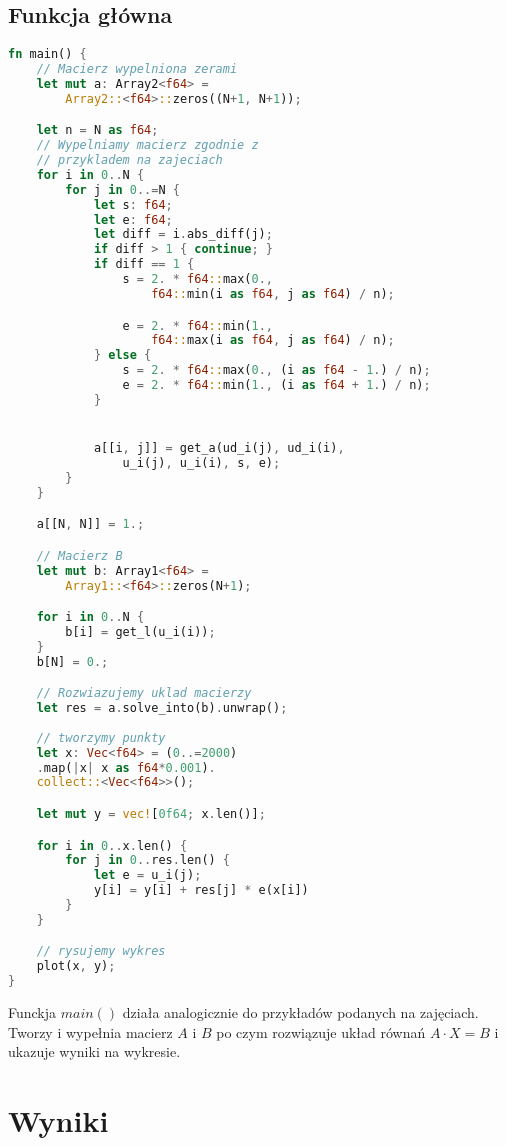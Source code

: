 \documentclass[12pt]{article}
\begin{document}
\subsection[short]{Funkcja główna}
\begin{lstlisting}[language=Rust, style=boxed, tabsize=2]
fn main() {
	// Macierz wypelniona zerami
	let mut a: Array2<f64> = 
		Array2::<f64>::zeros((N+1, N+1)); 

	let n = N as f64;
	// Wypelniamy macierz zgodnie z 
	// przykladem na zajeciach
	for i in 0..N {
		for j in 0..=N {
			let s: f64;
			let e: f64;
			let diff = i.abs_diff(j); 
			if diff > 1 { continue; }
			if diff == 1 {
				s = 2. * f64::max(0.,
					f64::min(i as f64, j as f64) / n);

				e = 2. * f64::min(1.,
					f64::max(i as f64, j as f64) / n);
			} else {
				s = 2. * f64::max(0., (i as f64 - 1.) / n);
				e = 2. * f64::min(1., (i as f64 + 1.) / n);
            }


			a[[i, j]] = get_a(ud_i(j), ud_i(i),
				u_i(j), u_i(i), s, e);
		}
	}

	a[[N, N]] = 1.;

	// Macierz B
	let mut b: Array1<f64> =
		Array1::<f64>::zeros(N+1);

	for i in 0..N {
		b[i] = get_l(u_i(i));
	}
	b[N] = 0.;

	// Rozwiazujemy uklad macierzy
	let res = a.solve_into(b).unwrap();
    
	// tworzymy punkty
	let x: Vec<f64> = (0..=2000)
	.map(|x| x as f64*0.001).
	collect::<Vec<f64>>();

	let mut y = vec![0f64; x.len()];

	for i in 0..x.len() {
		for j in 0..res.len() {
			let e = u_i(j);
			y[i] = y[i] + res[j] * e(x[i])
		}
	}

	// rysujemy wykres
	plot(x, y);
}	
\end{lstlisting}

\noindent Funckja $main()$ działa analogicznie do przykładów podanych na zajęciach.
Tworzy i wypełnia macierz $A$ i $B$ po czym rozwiązuje układ równań $A\cdot X = B$
i ukazuje wyniki na wykresie.

\newpage

\section[short]{Wyniki}
\end{document}
